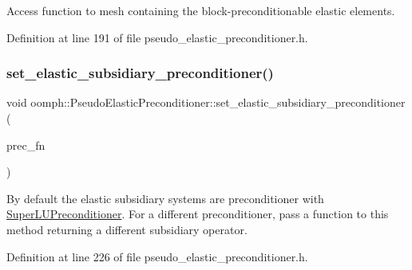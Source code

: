 Access function to mesh containing the block-\/preconditionable elastic elements. 



Definition at line 191 of file pseudo\+\_\+elastic\+\_\+preconditioner.\+h.

\mbox{\label{classoomph_1_1PseudoElasticPreconditioner_a8c75fe5786d64a042056df16a062c055}} 
\subsubsection{\texorpdfstring{set\+\_\+elastic\+\_\+subsidiary\+\_\+preconditioner()}{set\_elastic\_subsidiary\_preconditioner()}}
{\footnotesize\ttfamily void oomph\+::\+Pseudo\+Elastic\+Preconditioner\+::set\+\_\+elastic\+\_\+subsidiary\+\_\+preconditioner (\begin{DoxyParamCaption}\item[{\hyperlink{classoomph_1_1PseudoElasticPreconditioner_a1462e1ef48ed2668c06dfd36c783d1a5}{Subsidiary\+Preconditioner\+Fct\+Pt}}]{prec\+\_\+fn }\end{DoxyParamCaption})\hspace{0.3cm}{\ttfamily [inline]}}



By default the elastic subsidiary systems are preconditioner with \hyperlink{classoomph_1_1SuperLUPreconditioner}{Super\+L\+U\+Preconditioner}. For a different preconditioner, pass a function to this method returning a different subsidiary operator. 



Definition at line 226 of file pseudo\+\_\+elastic\+\_\+preconditioner.\+h.

\mbox{\label{classoomph_1_1PseudoElasticPreconditioner_a6030c2461383ee1a0b8ac6ed56b0daf6}} 
